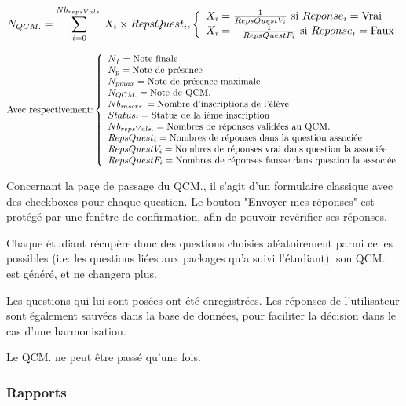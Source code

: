 \begin{equation}
    N_{QCM.} = \sum_{i = 0}^{Nb_{repsVals.}} X_{i} \times RepsQuest_{i} {,}
    \left\{
    \begin{array}{l l}
        X_{i} = \frac{1}{RepsQuestV_{i}} \text{ si }Reponse_{i} = \text{Vrai}\\
        X_{i} = -\frac{1}{RepsQuestF_{i}} \text{ si }Reponse_{i} = \text{Faux}\\
    \end{array}
    \right.
\end{equation}

$$
\text{Avec respectivement:}
\left\{
\begin{array}{l l l l l l l l}
N_{f} = \text{Note finale}\\
N_{p} = \text{Note de présence}\\
N_{pmax} = \text{Note de présence maximale}\\
N_{QCM.} = \text{Note de QCM.}\\
Nb_{inscrs.} = \text{Nombre d'inscriptions de l'élève}\\
Status_{i} = \text{Status de la ième inscription}\\
Nb_{repsVals.} = \text{Nombres de réponses validées au QCM.}\\
RepsQuest_{i} = \text{Nombres de réponses dans la question associée}\\
RepsQuestV_{i} = \text{Nombres de réponses vrai dans question la associée}\\
RepsQuestF_{i} = \text{Nombres de réponses fausse dans question la associée}\\
\end{array}
\right.
$$

Concernant la page de passage du QCM., il s'agit d'un formulaire classique avec des checkboxes pour chaque question.
Le bouton "Envoyer mes réponses" est protégé par une fenêtre de confirmation, afin de pouvoir revérifier ses réponses.

Chaque étudiant récupère donc des questions choisies aléatoirement parmi celles possibles (i.e: les questions liées aux packages qu'a
suivi l'étudiant), son QCM. est généré, et ne changera plus.

Les questions qui lui sont posées ont été enregistrées. Les réponses de l'utilisateur sont également sauvées dans la base de données,
pour faciliter la décision dans le cas d'une harmonisation.

Le QCM. ne peut être passé qu'une fois.

            \subsubsection{Rapports}


